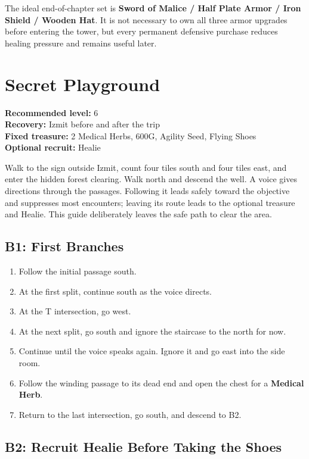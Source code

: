 \documentclass[
  american,
  10pt,
  letterpaper,
  oneside,
  open=any]{scrreprt}
\providecommand{\tightlist}{%
  \setlength{\itemsep}{0pt}\setlength{\parskip}{0pt}}
\begin{document}
The ideal end-of-chapter set is \textbf{Sword of Malice / Half Plate
Armor / Iron Shield / Wooden Hat}. It is not necessary to own all three
armor upgrades before entering the tower, but every permanent defensive
purchase reduces healing pressure and remains useful later.

\section{Secret Playground}\label{secret-playground}

\textbf{Recommended level:} 6\\
\textbf{Recovery:} Izmit before and after the trip\\
\textbf{Fixed treasure:} 2 Medical Herbs, 600G, Agility Seed, Flying
Shoes\\
\textbf{Optional recruit:} Healie

Walk to the sign outside Izmit, count four tiles south and four tiles
east, and enter the hidden forest clearing. Walk north and descend the
well. A voice gives directions through the passages. Following it leads
safely toward the objective and suppresses most encounters; leaving its
route leads to the optional treasure and Healie. This guide deliberately
leaves the safe path to clear the area.

\subsection{B1: First Branches}\label{b1-first-branches}

\begin{enumerate}
\def\labelenumi{\arabic{enumi}.}
\tightlist
\item
  Follow the initial passage south.
\item
  At the first split, continue south as the voice directs.
\item
  At the T intersection, go west.
\item
  At the next split, go south and ignore the staircase to the north for
  now.
\item
  Continue until the voice speaks again. Ignore it and go east into the
  side room.
\item
  Follow the winding passage to its dead end and open the chest for a
  \textbf{Medical Herb}.
\item
  Return to the last intersection, go south, and descend to B2.
\end{enumerate}

\subsection{B2: Recruit Healie Before Taking the
Shoes}\label{b2-recruit-healie-before-taking-the-shoes}
\end{document}
